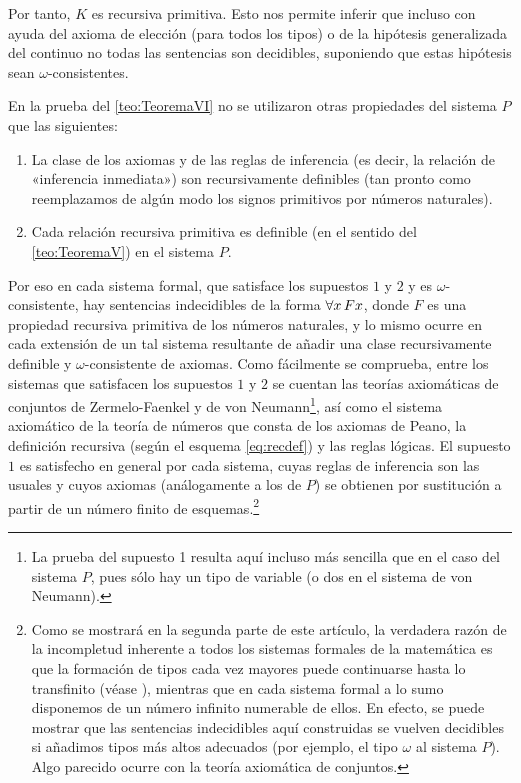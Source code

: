 Por tanto, $K$ es recursiva primitiva. Esto nos permite inferir que incluso con ayuda del axioma de elección (para todos los tipos) o de la hipótesis generalizada 
del continuo no todas las sentencias son decidibles, suponiendo que estas hipótesis sean $\omega$-consistentes.

En la prueba del \autoref{teo:TeoremaVI} no se utilizaron otras propiedades del sistema $P$ que las siguientes:

\begin{enumerate}
    \item La clase de los axiomas y de las reglas de inferencia (es decir, la relación de «inferencia inmediata») son recursivamente definibles (tan pronto como 
            reemplazamos de algún modo los signos primitivos por números naturales).
    \item Cada relación recursiva primitiva es definible (en el sentido del \autoref{teo:TeoremaV}) en el sistema $P$.
\end{enumerate}

Por eso en cada sistema formal, que satisface los supuestos $1$ y $2$ y es $\omega$-consistente, hay sentencias indecidibles de la forma $\forall x\thinspace Fx$,
donde $F$ es una propiedad recursiva primitiva de los números naturales, y lo mismo ocurre en cada extensión de un tal sistema resultante de añadir una clase 
recursivamente definible y $\omega$-consistente de axiomas. Como fácilmente se comprueba, entre los sistemas que satisfacen los supuestos $1$ y $2$ se cuentan
las teorías axiomáticas de conjuntos de Zermelo-Faenkel y de von Neumann\footnote{La prueba del supuesto 1 resulta aquí incluso más sencilla que en el caso
del sistema $P$, pues sólo hay un tipo de variable (o dos en el sistema de von Neumann).}, así como el sistema axiomático de la teoría de números que consta de 
los axiomas de Peano, la definición recursiva (según el esquema \eqref{eq:recdef}) y las reglas lógicas. El supuesto $1$ es satisfecho en general por cada sistema, 
cuyas reglas de inferencia son las usuales y cuyos axiomas (análogamente a los de $P$) se obtienen por sustitución a partir de un número finito de 
esquemas.\footnote{Como se mostrará en la segunda parte de este artículo, la verdadera razón de la incompletud inherente a todos los sistemas formales de la matemática 
es que la formación de tipos cada vez mayores puede continuarse hasta lo transfinito (véase \cite{hilbert1926unendliche}), mientras que en cada sistema formal a lo 
sumo disponemos de un número infinito numerable de ellos. En efecto, se puede mostrar que las sentencias indecidibles aquí construidas se vuelven decidibles si 
añadimos tipos más altos adecuados (por ejemplo, el tipo $\omega$ al sistema $P$). Algo parecido ocurre con la teoría axiomática de conjuntos.}


